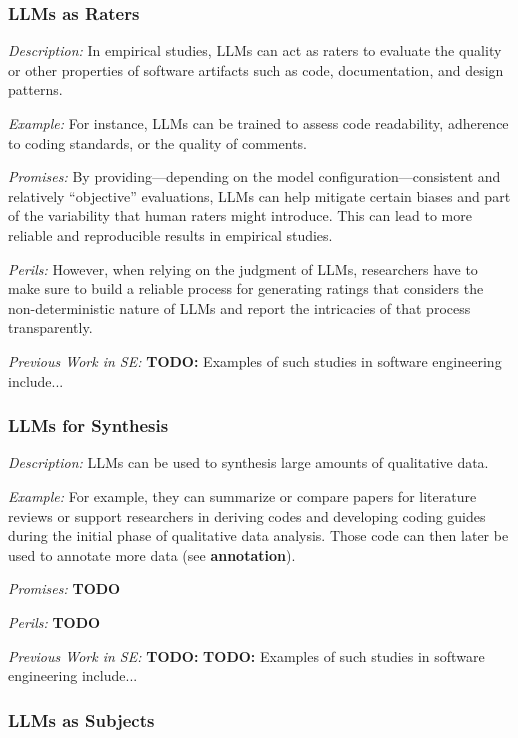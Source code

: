 \documentclass[11pt]{article}
\begin{document}
\subsubsection{LLMs as Raters}

\emph{Description:} In empirical studies, LLMs can act as raters to evaluate the quality or other properties of software artifacts such as code, documentation, and design patterns.

\emph{Example:}  For instance, LLMs can be trained to assess code readability, adherence to coding standards, or the quality of comments. 

\emph{Promises:} By providing---depending on the model configuration---consistent and relatively ``objective'' evaluations, LLMs can help mitigate certain biases and part of the variability that human raters might introduce. 
This can lead to more reliable and reproducible results in empirical studies.

\emph{Perils:} However, when relying on the judgment of LLMs, researchers have to make sure to build a reliable process for generating ratings that considers the non-deterministic nature of LLMs and report the intricacies of that process transparently.

\emph{Previous Work in SE:}  \textbf{TODO:} Examples of such studies in software engineering include...


\subsubsection{LLMs for Synthesis}

\emph{Description:} LLMs can be used to synthesis large amounts of qualitative data.

\emph{Example:}  For example, they can summarize or compare papers for literature reviews or support researchers in deriving codes and developing coding guides during the initial phase of qualitative data analysis. Those code can then later be used to annotate more data (see \textbf{annotation}).

\emph{Promises:} \textbf{TODO}

\emph{Perils:} \textbf{TODO}

\emph{Previous Work in SE:}  \textbf{TODO:}  \textbf{TODO:} Examples of such studies in software engineering include...


\subsubsection{LLMs as Subjects}
\end{document}
